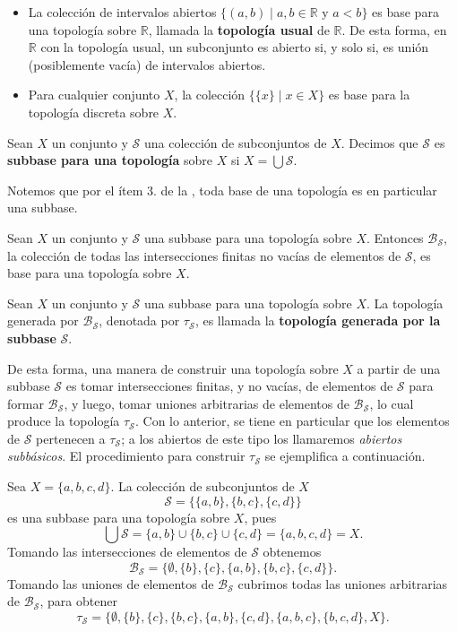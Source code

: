 \begin{Ejm}\label{Ejm:Bases}
   \phantom{o}\par
   \begin{itemize}
      \item La colección de intervalos abiertos $\{(a,b)\mid a,b\in \mathbb{R} \text{ y } a<b\}$ es base para una topología sobre $\mathbb{R}$, llamada la \textbf{topología usual} de $\mathbb{R}$. De esta forma, en $\mathbb{R}$ con la topología usual, un subconjunto es abierto si, y solo si, es unión (posiblemente vacía) de intervalos abiertos.
      \item Para cualquier conjunto $X$, la colección $\{\{ x\}\mid x\in X\}$ es base para la topología discreta sobre $X$.
   \end{itemize}
\end{Ejm}
\begin{Def}
   Sean $X$ un conjunto y $\mathcal{S}$ una colección de subconjuntos de $X$. Decimos que $\mathcal{S}$ es \textbf{subbase para una topología} sobre $X$ si $X=\bigcup \mathcal{S}$. 
\end{Def}
Notemos que por el ítem 3. de la , toda base de una topología es en particular una subbase.
\begin{Prop}
   Sean $X$ un conjunto y $\mathcal{S}$ una subbase para una topología sobre $X$. Entonces $\mathcal{B}_\mathcal{S}$, la colección de todas las intersecciones finitas no vacías de elementos de $\mathcal{S}$, es base para una topología sobre $X$.
\end{Prop}
\begin{Def}
   Sean $X$ un conjunto y $\mathcal{S}$ una subbase para una topología sobre $X$. La topología generada por $\mathcal{B}_\mathcal{S}$, denotada por $\tau_\mathcal{S}$, es llamada la \textbf{topología generada por la subbase} $\mathcal{S}$.
\end{Def}
De esta forma, una manera de construir una topología sobre $X$ a partir de una subbase $\mathcal{S}$ es tomar intersecciones finitas, y no vacías, de elementos de $\mathcal{S}$ para formar $\mathcal{B}_\mathcal{S}$, y luego, tomar uniones arbitrarias de elementos de $\mathcal{B}_\mathcal{S}$, lo cual produce la topología $\tau_\mathcal{S}$. Con lo anterior, se tiene en particular que los elementos de $\mathcal{S}$ pertenecen a $\tau_\mathcal{S}$; a los abiertos de este tipo los llamaremos \textit{abiertos subbásicos}. El procedimiento para construir $\tau_\mathcal{S}$ se ejemplifica a continuación.
\begin{Ejm}
   Sea $X=\{a,b,c,d\}$. La colección de subconjuntos de $X$ 
   $$
   \mathcal{S} = \{\{a, b\}, \{b, c\}, \{c, d\}\}
   $$
   es una subbase para una topología sobre $X$, pues
   $$
   \bigcup \mathcal{S} = \{a, b\} \cup \{b, c\} \cup \{c, d\} = \{a, b, c, d\} = X.
   $$
   Tomando las intersecciones de elementos de $\mathcal{S}$ obtenemos
   $$
   \mathcal{B}_\mathcal{S} = \{\emptyset, \{b\}, \{c\}, \{a, b\}, \{b, c\}, \{c, d\}\}.
   $$
   Tomando las uniones de elementos de $\mathcal{B}_\mathcal{S}$ cubrimos todas las uniones arbitrarias de $\mathcal{B}_\mathcal{S}$, para obtener
   $$
   \tau_\mathcal{S} = \{\emptyset, \{b\}, \{c\}, \{b, c\}, \{a, b\}, \{c, d\}, \{a, b, c\}, \{b, c, d\}, X\}.
   $$
\end{Ejm}
